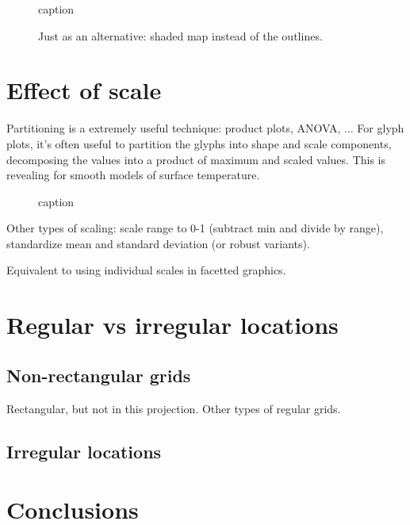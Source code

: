 \documentclass[oneside]{article}
\begin{document}
\begin{figure}[htbp]
  \centering
  \caption{caption}
  \label{fig:cloud}
\end{figure}

\begin{figure}[htbp]
  \centering
  \caption{Just as an alternative: shaded map instead of the outlines. }
  \label{fig:cloud-alt}
\end{figure}

\section{Effect of scale}

Partitioning is a extremely useful technique: product plots, ANOVA, ...  For glyph plots, it's often useful to partition the glyphs into shape and scale components, decomposing the values into a product of maximum and scaled values. This is revealing for smooth models of surface temperature.

\begin{figure}[htbp]
  \centering
  \caption{caption}
  \label{fig:label}
\end{figure}

Other types of scaling: scale range to 0-1 (subtract min and divide by range), standardize mean and standard deviation (or robust variants). 

Equivalent to using individual scales in facetted graphics.


\section{Regular vs irregular locations}

\subsection{Non-rectangular grids}

Rectangular, but not in this projection.  Other types of regular grids.

\subsection{Irregular locations}

\section{Conclusions}


\end{document}
